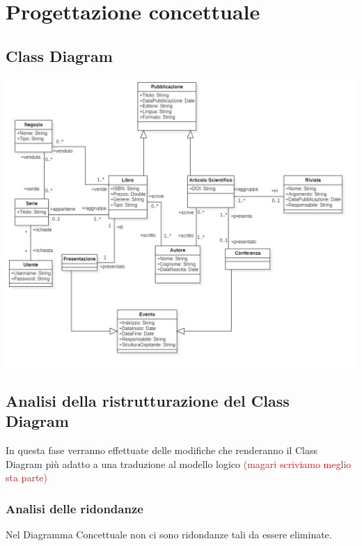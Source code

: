 \chapter{Progettazione concettuale}
    \section{Class Diagram}

    \includegraphics[scale=0.3]{Immagini/SchemaConcettuale_v1_2.png}
        
    \section{Analisi della ristrutturazione del Class Diagram}
        In questa fase verranno effettuate delle modifiche che renderanno il Class Diagram
        più adatto a una traduzione al modello logico \textcolor{red}{(magari scriviamo meglio sta parte)}
        \subsection{Analisi delle ridondanze}
        Nel Diagramma Concettuale non ci sono ridondanze tali da essere eliminate.
